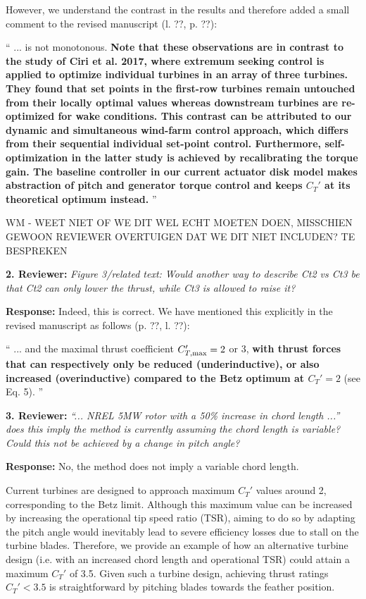 \documentclass[]{article}
\begin{document}
However, we understand the contrast in the results and therefore added a small comment to the revised manuscript  (l. ??, p. ??):

``
... is not monotonous. \textbf{Note that these observations are in contrast to the study of Ciri et al. 2017, where extremum seeking control is applied to optimize individual turbines in an array of three turbines. They found that set points in the first-row turbines remain untouched from their locally optimal values whereas downstream turbines are re-optimized for wake conditions. This contrast can be attributed to our dynamic and simultaneous wind-farm control approach, which differs from their sequential individual set-point control.  Furthermore, self-optimization in the latter study is achieved by recalibrating the torque gain. The baseline controller in our current actuator disk model makes abstraction of pitch and generator torque control and keeps $C_T'$ at its theoretical optimum instead.}
''

WM - WEET NIET OF WE DIT WEL ECHT MOETEN DOEN, MISSCHIEN GEWOON REVIEWER OVERTUIGEN DAT WE DIT NIET INCLUDEN? TE BESPREKEN

\dotfill

\textbf{2. Reviewer:} \textit{Figure 3/related text: Would another way to describe Ct2 vs Ct3 be that Ct2 can only lower the thrust, while Ct3 is allowed to raise it?}

\textbf{Response:} Indeed, this is correct. We have mentioned this explicitly in the revised manuscript as follows (p. ??, l. ??):

``
... and the maximal thrust coefficient $C_{T,\rm max}' = 2$ or 3, \textbf{with thrust forces that can respectively only be reduced (underinductive), or also increased (overinductive) compared to the Betz optimum at $C_T' = 2$} (see Eq. 5). 
''

\dotfill

\textbf{3. Reviewer:} \textit{``... NREL 5MW rotor with a 50\% increase in chord length ...'' does this imply the method is currently assuming the chord length is variable? Could this not be achieved by a change in pitch angle?}

\textbf{Response:} No, the method does not imply a variable chord length. 

Current turbines are designed to approach maximum $C_T'$ values around 2, corresponding to the Betz limit. Although this maximum value can be increased by increasing the operational tip speed ratio (TSR), aiming to do so by adapting the pitch angle would inevitably lead to severe efficiency losses due to stall on the turbine blades. Therefore, we provide an example of how an alternative turbine design (i.e. with an increased chord length and operational TSR) could attain a maximum $C_T'$ of 3.5. Given such a turbine design, achieving thrust ratings $C_T' < 3.5$ is straightforward by pitching blades towards the feather position. 
\end{document}
